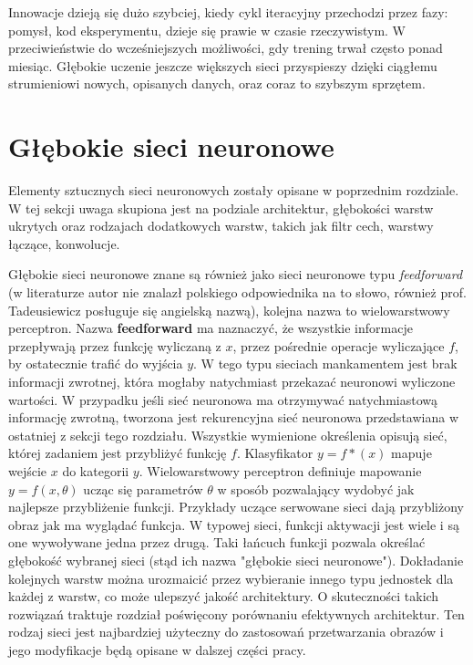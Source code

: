 \documentclass[12pt,a4paper,twoside,titlepage,openright]{book}
\begin{document}
Innowacje dzieją się dużo szybciej, kiedy cykl iteracyjny przechodzi przez fazy: pomysł, kod eksperymentu, dzieje się prawie w czasie rzeczywistym. W przeciwieństwie do wcześniejszych możliwości, gdy trening trwał często ponad miesiąc. Głębokie uczenie jeszcze większych sieci przyspieszy dzięki ciągłemu strumieniowi nowych, opisanych danych, oraz coraz to szybszym sprzętem.

\section{Głębokie sieci neuronowe}
Elementy sztucznych sieci neuronowych zostały opisane w poprzednim rozdziale. W tej sekcji uwaga skupiona jest na podziale architektur, głębokości warstw ukrytych oraz rodzajach dodatkowych warstw, takich jak filtr cech, warstwy łączące, konwolucje.

Głębokie sieci neuronowe znane są również jako sieci neuronowe typu \textit{feedforward} (w literaturze autor nie znalazł polskiego odpowiednika na to słowo, również prof. Tadeusiewicz posługuje się angielską nazwą), kolejna nazwa to wielowarstwowy perceptron. Nazwa \textbf{feedforward} ma naznaczyć, że wszystkie informacje przepływają przez funkcję wyliczaną z \(x\), przez pośrednie operacje wyliczające \(f\), by ostatecznie trafić do wyjścia \(y\). W tego typu sieciach mankamentem jest brak informacji zwrotnej, która mogłaby natychmiast przekazać neuronowi wyliczone wartości. W przypadku jeśli sieć neuronowa ma otrzymywać natychmiastową informację zwrotną, tworzona jest rekurencyjna sieć neuronowa przedstawiana w ostatniej z sekcji tego rozdziału. Wszystkie wymienione określenia opisują sieć, której zadaniem jest przybliżyć funkcję \(f\). Klasyfikator \(y = f*(x) \) mapuje wejście \(x\) do kategorii \(y\). Wielowarstwowy perceptron definiuje mapowanie \(y = f(x,\theta)\) ucząc się parametrów \(\theta\) w sposób pozwalający wydobyć jak najlepsze przybliżenie funkcji. Przykłady uczące serwowane sieci dają przybliżony obraz jak ma wyglądać funkcja. W typowej sieci, funkcji aktywacji jest wiele i są one wywoływane jedna przez drugą. Taki łańcuch funkcji pozwala określać głębokość wybranej sieci (stąd ich nazwa "głębokie sieci neuronowe"). Dokładanie kolejnych warstw można urozmaicić przez wybieranie innego typu jednostek dla każdej z warstw, co może ulepszyć jakość architektury. O skuteczności takich rozwiązań traktuje rozdział poświęcony porównaniu efektywnych architektur. Ten rodzaj sieci jest najbardziej użyteczny do zastosowań przetwarzania obrazów i jego modyfikacje będą opisane w dalszej części pracy.
\end{document}
